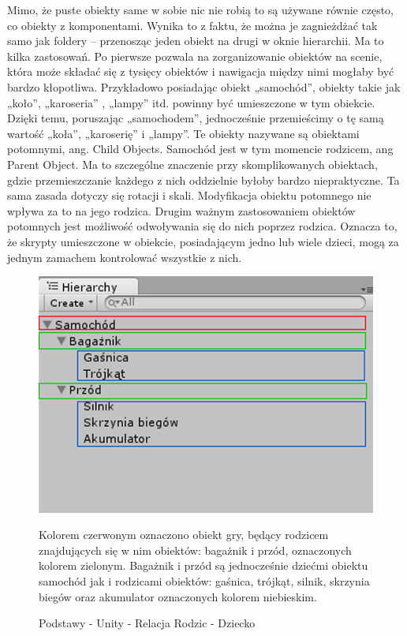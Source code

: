 \documentclass[brudnopis]{xmgr}
\begin{document}
Mimo, że puste obiekty same w sobie nic nie robią to są używane równie często, co obiekty z komponentami. Wynika to z faktu, że można je zagnieżdżać tak samo jak foldery – przenosząc jeden obiekt na drugi w oknie hierarchii. Ma to kilka zastosowań. Po pierwsze pozwala na zorganizowanie obiektów na scenie, która może składać się z tysięcy obiektów i nawigacja między nimi mogłaby być bardzo kłopotliwa. Przykładowo posiadając obiekt „samochód”, obiekty takie jak „koło”, „karoseria” , „lampy” itd. powinny być umieszczone w tym obiekcie. Dzięki temu, poruszając „samochodem”, jednocześnie przemieścimy o tę samą wartość „koła”, „karoserię” i „lampy”. Te obiekty nazywane są obiektami potomnymi, ang. Child Objects. Samochód jest w tym momencie rodzicem, ang Parent Object. Ma to szczególne znaczenie przy skomplikowanych obiektach, gdzie przemieszczanie każdego z nich oddzielnie byłoby bardzo niepraktyczne. Ta sama zasada dotyczy się rotacji i skali. Modyfikacja obiektu potomnego nie wpływa za to na jego rodzica. Drugim ważnym zastosowaniem obiektów potomnych jest możliwość odwoływania się do nich poprzez rodzica. Oznacza to, że skrypty umieszczone w obiekcie, posiadającym jedno lub wiele dzieci, mogą za jednym zamachem kontrolować wszystkie z nich.

\begin{figure}[!htb]
    \begin{center}
    \includegraphics[scale=0.25]{Screeny/rodzial5screeny/przyklad_relacji_rodzic_dziecko}
    \end{center}
    \caption{Podstawy - Unity - Relacja Rodzic - Dziecko}
Kolorem czerwonym oznaczono obiekt gry, będący rodzicem znajdujących się w nim obiektów: bagażnik i przód, oznaczonych kolorem zielonym. Bagażnik i przód są jednocześnie dziećmi obiektu samochód jak i rodzicami obiektów: gaśnica, trójkąt, silnik, skrzynia biegów oraz akumulator oznaczonych kolorem niebieskim.
\end{figure}
\end{document}
